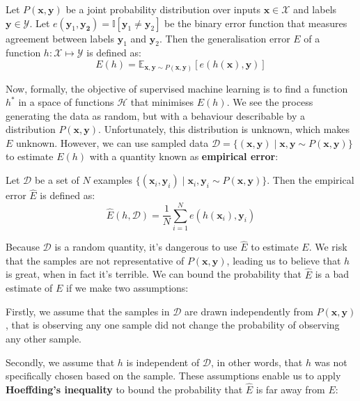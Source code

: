 \begin{definition} \label{generalisation_error}
	Let $P(\mathbf{x}, \mathbf{y})$ be a joint probability distribution over inputs $\mathbf{x} \in \mathcal{X}$ and labels $\mathbf{y} \in \mathcal{Y}$. Let $e(\mathbf{y}_1, \mathbf{y_2}) = \mathbb{I}[\mathbf{y}_1 \neq \mathbf{y}_2]$ be the binary error function that measures agreement between labels $\mathbf{y}_1$ and $\mathbf{y}_2$. Then the generalisation error $E$ of a function $h: \mathcal{X} \mapsto \mathcal{Y}$ is defined as:
	$$
		E(h) = \mathbb{E}_{\mathbf{x},\mathbf{y}\sim P(\mathbf{x}, \mathbf{y})}[e(h(\mathbf{x}), \mathbf{y})]
	$$
\end{definition}
Now, formally, the objective of supervised machine learning is to find a function $h^*$ in a space of functions $\mathcal{H}$ that minimises $E(h)$. We see the process generating the data as random, but with a behaviour describable by a distribution $P(\mathbf{x}, \mathbf{y})$. Unfortunately, this distribution is unknown, which makes $E$ unknown. However, we can use sampled data $\mathcal{D} = \{(\mathbf{x}, \mathbf{y}) \mid \mathbf{x}, \mathbf{y} \sim P(\mathbf{x}, \mathbf{y})\}$ to estimate $E(h)$ with a quantity known as \textbf{empirical error}:

\begin{definition} \label{empirical_error}
	Let $\mathcal{D}$ be a set of $N$ examples $\{(\mathbf{x}_i, \mathbf{y}_i) \mid \mathbf{x}_i, \mathbf{y}_i \sim P(\mathbf{x}, \mathbf{y})\}$. Then the empirical error $\hat{E}$ is defined as:
	$$
		\hat{E}(h, \mathcal{D}) = \frac{1}{N}\sum\limits_{i=1}^N e(h(\mathbf{x}_i), \mathbf{y}_i)
	$$
\end{definition}

Because $\mathcal{D}$ is a random quantity, it's dangerous to use $\hat{E}$ to estimate $E$. We risk that the samples are not representative of $P(\mathbf{x}, \mathbf{y})$, leading us to believe that $h$ is great, when in fact it's terrible. We can bound the probability that $\hat{E}$ is a bad estimate of $E$ if we make two assumptions:

Firstly, we assume that the samples in $\mathcal{D}$ are drawn independently from $P(\mathbf{x}, \mathbf{y})$, that is observing any one sample did not change the probability of observing any other sample.

Secondly, we assume that $h$ is independent of $\mathcal{D}$, in other words, that $h$ was not specifically chosen based on the sample. These assumptions enable us to apply \textbf{Hoeffding's inequality} to bound the probability that $\hat{E}$ is far away from $E$:

